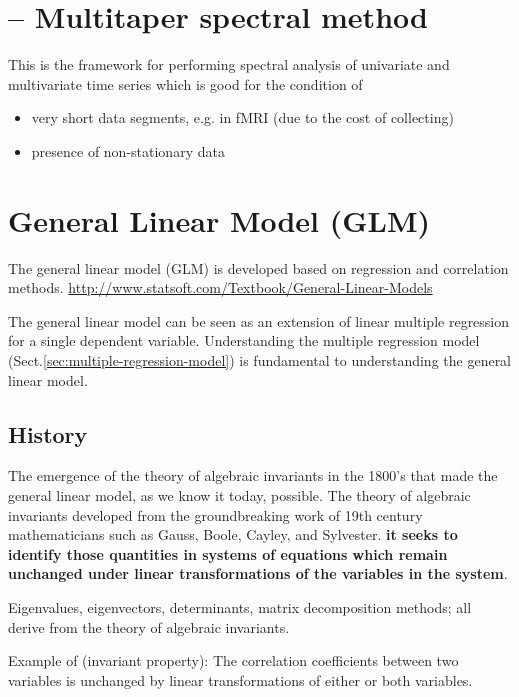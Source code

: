 \section{-- Multitaper spectral method}
\label{sec:Multitaper-spectral-method}

This is the framework for performing spectral analysis of univariate and
multivariate time series which is good for the condition of 
\begin{itemize}
  \item very short data segments, e.g. in fMRI (due to the cost of collecting)
  
  \item presence of non-stationary data
\end{itemize}

\section{General Linear Model (GLM)}
\label{sec:GLM}

The general linear model (GLM) is developed based on regression and correlation
methods.
\url{http://www.statsoft.com/Textbook/General-Linear-Models}

The general linear model can be seen as an extension of linear multiple
regression for a single dependent variable.
Understanding the multiple regression model
(Sect.\ref{sec:multiple-regression-model}) is fundamental to understanding the
general linear model.


\subsection{History}

The emergence of the theory of algebraic invariants in the 1800's that made the
general linear model, as we know it today, possible.
The theory of algebraic invariants developed from the groundbreaking work of
19th century mathematicians such as Gauss, Boole, Cayley, and Sylvester.
{\bf it seeks to identify those quantities in systems of equations which remain
unchanged under linear transformations of the variables in the system}.

Eigenvalues, eigenvectors, determinants, matrix decomposition methods; all
derive from the theory of algebraic invariants.

Example of (invariant property):  The correlation coefficients between two
variables is unchanged by linear transformations of either or both variables.

